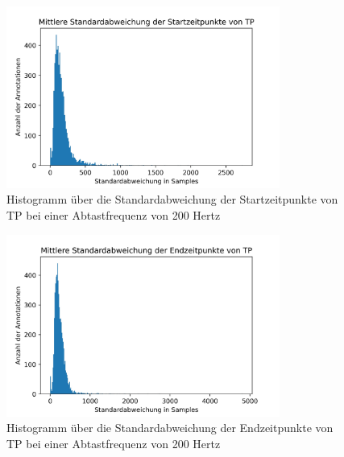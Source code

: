 \begin{figure}[!ht]%
	\begin{center}
	\includegraphics[width=0.80\textwidth]{./Bilder/LMStartDistribution_stds.jpg}
	\end{center}
	\caption{Histogramm über die Standardabweichung der Startzeitpunkte von TP bei einer Abtastfrequenz von 200 Hertz}%
	\label{fig:AASMKrit}%
\end{figure}

\begin{figure}[!ht]%
	\begin{center}
	\includegraphics[width=0.80\textwidth]{./Bilder/LMEndDistribution_stds.jpg}
	\end{center}
	\caption{Histogramm über die Standardabweichung der Endzeitpunkte von TP bei einer Abtastfrequenz von 200 Hertz}%
	\label{fig:AASMKrit}%
\end{figure}

